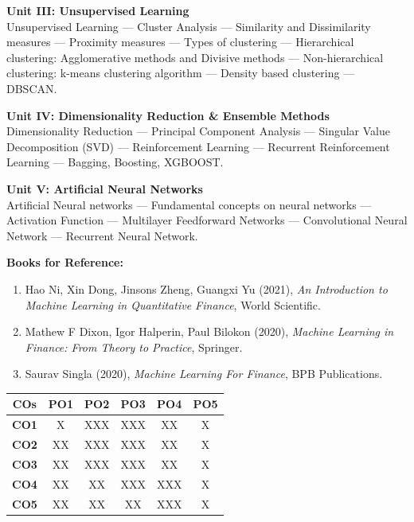 \vspace{0.3em}
\noindent\textbf{Unit III: Unsupervised Learning}\\
\small
Unsupervised Learning --- Cluster Analysis --- Similarity and Dissimilarity measures --- Proximity measures --- Types of clustering --- Hierarchical clustering: Agglomerative methods and Divisive methods --- Non-hierarchical clustering: k-means clustering algorithm --- Density based clustering --- DBSCAN.
\normalsize

\vspace{0.3em}
\noindent\textbf{Unit IV: Dimensionality Reduction \& Ensemble Methods}\\
\small
Dimensionality Reduction --- Principal Component Analysis --- Singular Value Decomposition (SVD) --- Reinforcement Learning --- Recurrent Reinforcement Learning --- Bagging, Boosting, XGBOOST.
\normalsize

\vspace{0.3em}
\noindent\textbf{Unit V: Artificial Neural Networks}\\
\small
Artificial Neural networks --- Fundamental concepts on neural networks --- Activation Function --- Multilayer Feedforward Networks --- Convolutional Neural Network --- Recurrent Neural Network.
\normalsize

\vspace{0.5em}
\noindent\textbf{Books for Reference:}
\begin{enumerate}[leftmargin=1.5em, label=\arabic*., itemsep=1pt, topsep=1pt, parsep=0pt]
    \small
    \item Hao Ni, Xin Dong, Jinsons Zheng, Guangxi Yu (2021), \textit{An Introduction to Machine Learning in Quantitative Finance}, World Scientific.
    \item Mathew F Dixon, Igor Halperin, Paul Bilokon (2020), \textit{Machine Learning in Finance: From Theory to Practice}, Springer.
    \item Saurav Singla (2020), \textit{Machine Learning For Finance}, BPB Publications.
\end{enumerate}

\vspace{0.4em}
\begin{center}
\footnotesize
\begin{tabular}{|c|c|c|c|c|c|}
\hline
\textbf{COs} & \textbf{PO1} & \textbf{PO2} & \textbf{PO3} & \textbf{PO4} & \textbf{PO5} \\
\hline
\textbf{CO1} & X & XXX & XXX & XX & X \\
\hline
\textbf{CO2} & XX & XXX & XXX & XX & X \\
\hline
\textbf{CO3} & XX & XXX & XXX & XX & X \\
\hline
\textbf{CO4} & XX & XX & XXX & XXX & X \\
\hline
\textbf{CO5} & XX & XX & XX & XXX & X \\
\hline
\end{tabular}
\end{center}
\normalsize

\newpage
